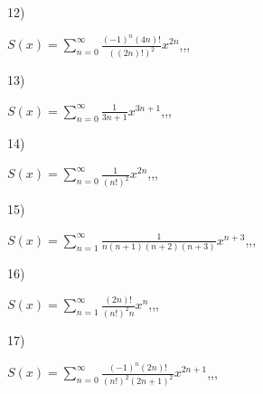 \documentclass[11pt, ukrainian]{article}
\begin{document}
\par
\vspace{0.9cm}
12) \space 
{%
{$S(x)=\sum\limits_{n=0}^{\infty}{\frac{{(-1)^n}(4n)!}{{((2n)!)^2}}}{x^{{2n}}}$},,, \par \smallskip  
}
\par
\vspace{0.9cm}
13) \space 
{%
{$S(x)=\sum\limits_{n=0}^{\infty}{\frac{1}{3n+1}}{x^{{3n+1}}}$},,, \par \smallskip  
}
\par
\vspace{0.9cm}
14) \space 
{%
{$S(x)=\sum\limits_{n=0}^{\infty}{\frac{1}{(n!)^2}}{x^{{2n}}}$},,, \par \smallskip  
}
\par
\vspace{0.9cm}
15) \space 
{%
{$S(x)=\sum\limits_{n=1}^{\infty}{\frac{1}{n(n+1)(n+2)(n+3)}}{x^{{n+3}}}$},,, \par \smallskip  
}
\par
\vspace{0.9cm}
16) \space 
{%
{$S(x)=\sum\limits_{n=1}^{\infty}{\frac{(2n)!}{{(n!)^2}n}}{x^{n}}$},,, \par \smallskip  
}
\par
\newpage
17) \space 
{%
{$S(x)=\sum\limits_{n=0}^{\infty}{\frac{{(-1)^n}(2n)!}{{(n!)^2}{(2n+1)^2}}}{x^{{2n+1}}}$},,, \par \smallskip  
}
\end{document}
